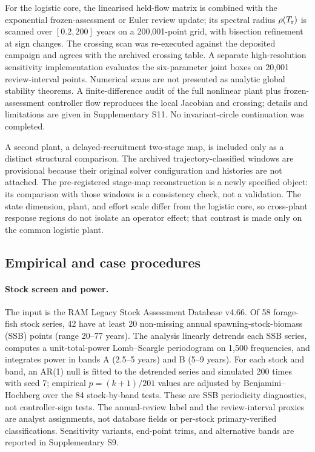 For the logistic core, the linearised held-flow matrix is combined with the exponential frozen-assessment or Euler review update; its spectral radius \(\rho(T_{\mathrm r})\) is scanned over \([0.2,200]\) years on a 200,001-point grid, with bisection refinement at sign changes. The crossing scan was re-executed against the deposited campaign and agrees with the archived crossing table. A separate high-resolution sensitivity implementation evaluates the six-parameter joint boxes on 20,001 review-interval points. Numerical scans are not presented as analytic global stability theorems. A finite-difference audit of the full nonlinear plant plus frozen-assessment controller flow reproduces the local Jacobian and crossing; details and limitations are given in Supplementary S11. No invariant-circle continuation was completed.

A second plant, a delayed-recruitment two-stage map, is included only as a distinct structural comparison. The archived trajectory-classified windows are provisional because their original solver configuration and histories are not attached. The pre-registered stage-map reconstruction is a newly specified object: its comparison with those windows is a consistency check, not a validation. The state dimension, plant, and effort scale differ from the logistic core, so cross-plant response regions do not isolate an operator effect; that contrast is made only on the common logistic plant.

\subsection{Empirical and case procedures}\label{sec:empirical-methods}

\paragraph{Stock screen and power.} The input is the RAM Legacy Stock Assessment Database v4.66. Of 58 forage-fish stock series, 42 have at least 20 non-missing annual spawning-stock-biomass (SSB) points (range 20--77 years). The analysis linearly detrends each SSB series, computes a unit-total-power Lomb--Scargle periodogram on 1,500 frequencies, and integrates power in bands A (2.5--5 years) and B (5--9 years). For each stock and band, an AR(1) null is fitted to the detrended series and simulated 200 times with seed 7; empirical \(p=(k+1)/201\) values are adjusted by Benjamini--Hochberg over the 84 stock-by-band tests. These are SSB periodicity diagnostics, not controller-sign tests. The annual-review label and the review-interval proxies are analyst assignments, not database fields or per-stock primary-verified classifications. Sensitivity variants, end-point trims, and alternative bands are reported in Supplementary S9.

